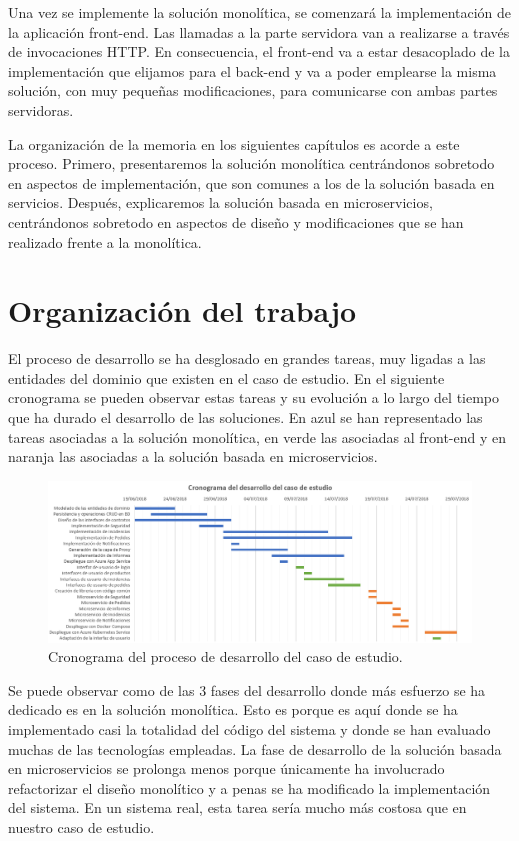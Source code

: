 \documentclass[11pt,spanish,listoffigures]{tfgetsinf}
\begin{document}
Una vez se implemente la solución monolítica, se comenzará la implementación de la aplicación front-end. Las llamadas a la parte servidora van a realizarse a través de invocaciones HTTP. En consecuencia, el front-end va a estar desacoplado de la implementación que elijamos para el back-end y va a poder emplearse la misma solución, con muy pequeñas modificaciones, para comunicarse con ambas partes servidoras.

La organización de la memoria en los siguientes capítulos es acorde a este proceso. Primero, presentaremos la solución monolítica centrándonos sobretodo en aspectos de implementación, que son comunes a los de la solución basada en servicios. Después, explicaremos la solución basada en microservicios, centrándonos sobretodo en aspectos de diseño y modificaciones que se han realizado frente a la monolítica.

\section{Organización del trabajo}

El proceso de desarrollo se ha desglosado en grandes tareas, muy ligadas a las entidades del dominio que existen en el caso de estudio. En el siguiente cronograma se pueden observar estas tareas y su evolución a lo largo del tiempo que ha durado el desarrollo de las soluciones. En azul se han representado las tareas asociadas a la solución monolítica, en verde las asociadas al front-end y en naranja las asociadas a la solución basada en microservicios.

\begin{figure}[h]
\centering
\includegraphics[scale=0.5]{Cronograma}
\caption{Cronograma del proceso de desarrollo del caso de estudio.}
\end{figure}

Se puede observar como de las 3 fases del desarrollo donde más esfuerzo se ha dedicado es en la solución monolítica. Esto es porque es aquí donde se ha implementado casi la totalidad del código del sistema y donde se han evaluado muchas de las tecnologías empleadas. La fase de desarrollo de la solución basada en microservicios se prolonga menos porque únicamente ha involucrado refactorizar el diseño monolítico y a penas se ha modificado la implementación del sistema. En un sistema real, esta tarea sería mucho más costosa que en nuestro caso de estudio.
\end{document}
